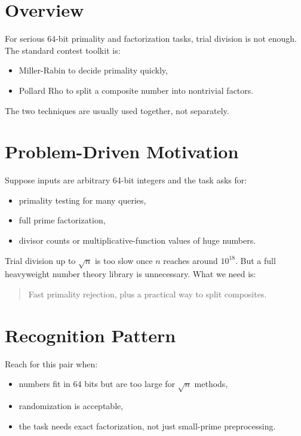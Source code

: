 \section*{Overview}

For serious 64-bit primality and factorization tasks, trial division is not enough. The standard contest toolkit is:

\begin{itemize}
  \item Miller-Rabin to decide primality quickly,
  \item Pollard Rho to split a composite number into nontrivial factors.
\end{itemize}

The two techniques are usually used together, not separately.

\section*{Problem-Driven Motivation}

Suppose inputs are arbitrary 64-bit integers and the task asks for:

\begin{itemize}
  \item primality testing for many queries,
  \item full prime factorization,
  \item divisor counts or multiplicative-function values of huge numbers.
\end{itemize}

Trial division up to \(\sqrt{n}\) is too slow once \(n\) reaches around \(10^{18}\). But a full heavyweight number
theory library is unnecessary. What we need is:

\begin{quote}
Fast primality rejection, plus a practical way to split composites.
\end{quote}

\section*{Recognition Pattern}

Reach for this pair when:

\begin{itemize}
  \item numbers fit in 64 bits but are too large for \(\sqrt{n}\) methods,
  \item randomization is acceptable,
  \item the task needs exact factorization, not just small-prime preprocessing.
\end{itemize}

